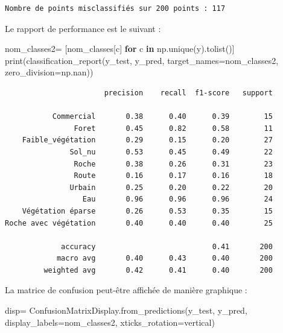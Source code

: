 \documentclass[
  11pt,
  letterpaper,
  open=any,
  twoside=false,
  french]{scrbook}
\newenvironment{Shaded}{\begin{snugshade}}{\end{snugshade}}
\newcommand{\BuiltInTok}[1]{\textcolor[rgb]{0.00,0.23,0.31}{#1}}
\newcommand{\ControlFlowTok}[1]{\textcolor[rgb]{0.00,0.23,0.31}{\textbf{#1}}}
\newcommand{\KeywordTok}[1]{\textcolor[rgb]{0.00,0.23,0.31}{\textbf{#1}}}
\newcommand{\NormalTok}[1]{\textcolor[rgb]{0.00,0.23,0.31}{#1}}
\newcommand{\OperatorTok}[1]{\textcolor[rgb]{0.37,0.37,0.37}{#1}}
\newcommand{\StringTok}[1]{\textcolor[rgb]{0.13,0.47,0.30}{#1}}
\begin{document}
\begin{verbatim}
Nombre de points misclassifiés sur 200 points : 117
\end{verbatim}

Le rapport de performance est le suivant :

\begin{Shaded}
\begin{Highlighting}[]
\NormalTok{nom\_classes2}\OperatorTok{=}\NormalTok{ [nom\_classes[c] }\ControlFlowTok{for}\NormalTok{ c }\KeywordTok{in}\NormalTok{ np.unique(y).tolist()]}
\BuiltInTok{print}\NormalTok{(classification\_report(y\_test, y\_pred, target\_names}\OperatorTok{=}\NormalTok{nom\_classes2, zero\_division}\OperatorTok{=}\NormalTok{np.nan))}
\end{Highlighting}
\end{Shaded}

\begin{verbatim}
                       precision    recall  f1-score   support

           Commercial       0.38      0.40      0.39        15
                Foret       0.45      0.82      0.58        11
    Faible_végétation       0.29      0.15      0.20        27
               Sol_nu       0.53      0.45      0.49        22
                Roche       0.38      0.26      0.31        23
                Route       0.16      0.17      0.16        18
               Urbain       0.25      0.20      0.22        20
                  Eau       0.96      0.96      0.96        24
    Végétation éparse       0.26      0.53      0.35        15
Roche avec végétation       0.40      0.40      0.40        25

             accuracy                           0.41       200
            macro avg       0.40      0.43      0.40       200
         weighted avg       0.42      0.41      0.40       200
\end{verbatim}

La matrice de confusion peut-être affichée de manière graphique :

\begin{Shaded}
\begin{Highlighting}[]
\NormalTok{disp}\OperatorTok{=}\NormalTok{ ConfusionMatrixDisplay.from\_predictions(y\_test, y\_pred, display\_labels}\OperatorTok{=}\NormalTok{nom\_classes2, xticks\_rotation}\OperatorTok{=}\StringTok{\textquotesingle{}vertical\textquotesingle{}}\NormalTok{)}
\end{Highlighting}
\end{Shaded}
\end{document}

